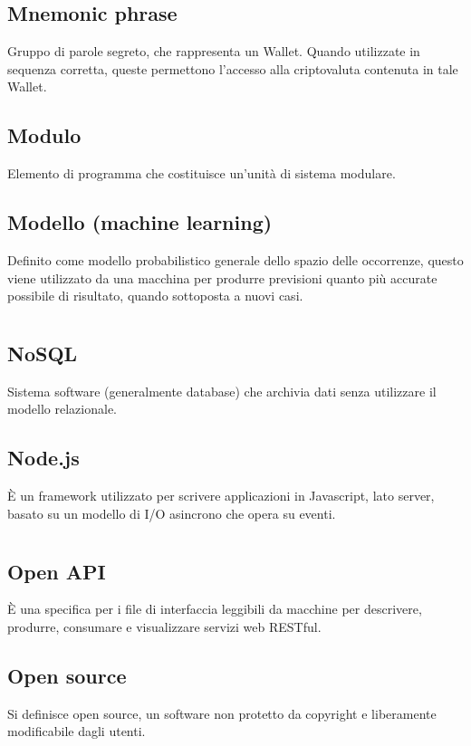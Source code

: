 	\subsection*{Mnemonic phrase}
	Gruppo di parole segreto, che rappresenta un Wallet. Quando utilizzate in sequenza corretta, queste permettono l’accesso alla criptovaluta contenuta in tale Wallet.
	\subsection*{Modulo}
	Elemento di programma che costituisce un’unità di sistema modulare.
	\subsection*{Modello (machine learning)}
	Definito come modello probabilistico generale dello spazio delle occorrenze, questo viene utilizzato da una macchina per produrre previsioni quanto più accurate possibile di risultato, quando sottoposta a nuovi casi.
\pagebreak
\section[N]{}
	\subsection*{NoSQL}
	Sistema software (generalmente database) che archivia dati senza utilizzare il modello relazionale.
	\subsection*{Node.js}
	È un framework utilizzato per scrivere applicazioni in Javascript, lato server, basato su un modello di I/O asincrono che opera su eventi. 
\pagebreak
\section[O]{}
	\subsection*{Open API}
	È una specifica per i file di interfaccia leggibili da macchine per descrivere, produrre, consumare e visualizzare servizi web RESTful.
	\subsection*{Open source}
	Si definisce open source, un software non protetto da copyright e liberamente modificabile dagli utenti.
